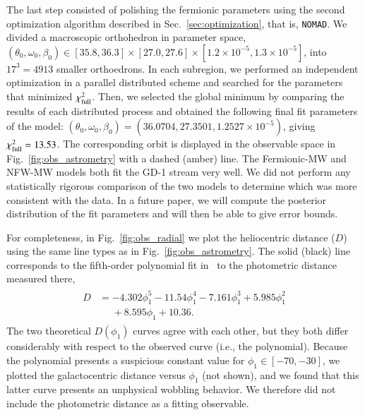 \documentclass[twocolumn]{aa}
\begin{document}
The last step consisted of polishing the fermionic parameters using the second optimization algorithm described in Sec.~\ref{sec:optimization}, that is, \texttt{NOMAD}. We divided a  macroscopic orthohedron in parameter space, $(\theta_0, \omega_0, \beta_0) \in [35.8, 36.3]\times[27.0, 27.6]\times [1.2\times10^{-5}, 1.3\times10^{-5}]$, into $17^3=4913$ smaller orthoedrons. In each subregion, we performed an independent optimization in a parallel distributed scheme and searched for the parameters that minimized $\chi^2_{\rm{full}}$. Then, we selected the global minimum by comparing the results of each distributed process and obtained the following final fit parameters of the model: $(\theta_0, \omega_0, \beta_0)= (36.0704, 27.3501, 1.2527\times10^{-5})$, giving $\chi^2_{\rm{full}}= 13.53$.
The corresponding orbit is displayed in the observable space in
Fig.~\ref{fig:obs_astrometry} with a dashed (amber) line. The Fermionic-MW and NFW-MW models both fit the GD-1 stream very well.
We did not perform any statistically rigorous comparison of the two models to determine which was more consistent with the data. In a future paper, we will compute the posterior distribution of the fit parameters and will then be able to give error bounds.


For completeness, in Fig.~\ref{fig:obs_radial} we plot the heliocentric distance ($D$) using the same line types as in Fig.~\ref{fig:obs_astrometry}. The solid (black) line corresponds to the fifth-order polynomial fit in~\cite{Ibata_2020} to the photometric distance measured there,
\begin{align}
 \label{phot_dist}
    \begin{split}
        D &= -4.302\phi_1^5 - 11.54\phi_1^4 - 7.161\phi_1^3 + 5.985\phi_1^2\\
      &\phantom{=} + 8.595\phi_1+10.36.
    \end{split}
\end{align}
The two theoretical $D(\phi_1)$ curves agree with each other, but they both differ considerably with respect to the observed curve (i.e., the polynomial). Because the polynomial presents a suspicious constant value for $\phi_1 \in [-70,-30]$, we plotted the galactocentric distance versus $\phi_1$ (not shown), and we found that this latter curve presents an unphysical wobbling behavior. We therefore did not include the photometric distance as a fitting observable.
\end{document}
